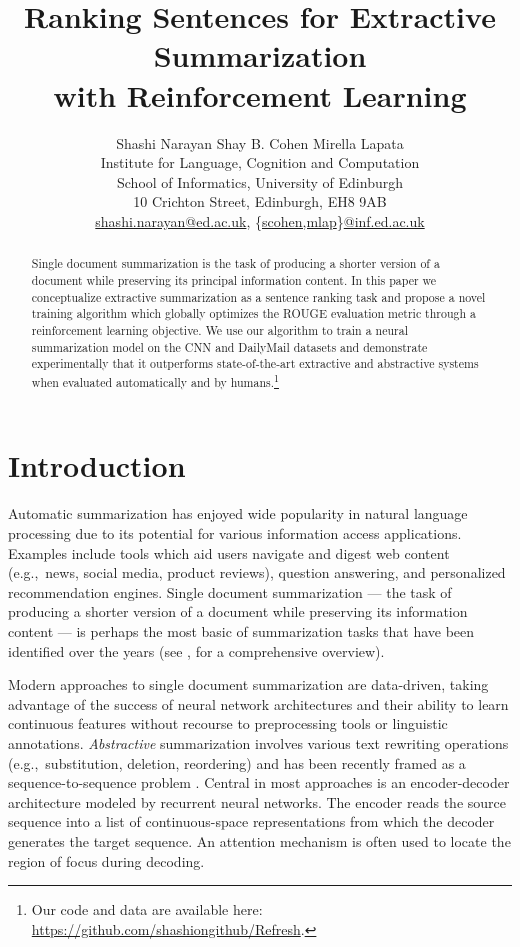 \documentclass[11pt,a4paper]{article}
\title{Ranking Sentences for Extractive Summarization \\ with
  Reinforcement Learning}
\author{Shashi Narayan \quad Shay B. Cohen \quad Mirella Lapata \\ 
Institute for Language, Cognition and Computation \\
 School of Informatics, University of Edinburgh \\ 
 10 Crichton Street, Edinburgh, EH8 9AB  \\ 
\url{shashi.narayan@ed.ac.uk},
\{\url{scohen,mlap}\}\url{@inf.ed.ac.uk} 
}
\date{}
\begin{document}
\maketitle

\begin{abstract}
  Single document summarization is the task of producing a shorter
  version of a document while preserving its principal information
  content.  In this paper we conceptualize extractive summarization as
  a sentence ranking task and propose a novel training algorithm which
  globally optimizes the ROUGE evaluation metric through a
  reinforcement learning objective.  We use our algorithm to train a
  neural summarization model on the CNN and DailyMail datasets and
  demonstrate experimentally that it outperforms state-of-the-art
  extractive and abstractive systems when evaluated automatically and
  by humans.\footnote{Our code and data are available here:
    \url{https://github.com/shashiongithub/Refresh}.}
\end{abstract}

\section{Introduction}
\label{sec:intro}

Automatic summarization has enjoyed wide popularity in natural
language processing due to its potential for various information
access applications. Examples include tools which aid users navigate
and digest web content (e.g.,~news, social media, product reviews),
question answering, and personalized recommendation engines. Single
document summarization --- the task of producing a shorter version of
a document while preserving its information content --- is perhaps the
most basic of summarization tasks that have been identified over the
years (see \citeauthor{Nenkova:McKeown:2011},
\citeyear{Nenkova:McKeown:2011} for a comprehensive overview).

Modern approaches to single document summarization are data-driven,
taking advantage of the success of neural network architectures and
their ability to learn continuous features without recourse to
preprocessing tools or linguistic annotations.  \emph{Abstractive}
summarization involves various text rewriting operations
(e.g.,~substitution, deletion, reordering) and has been recently
framed as a sequence-to-sequence problem
\cite{sutskever-nips14}. Central in most approaches
\cite{rush-acl15,chenIjcai-16,nallapati-signll16,see-acl17,tanwan-acl17,paulus-socher-arxiv17}
is an encoder-decoder architecture modeled by recurrent neural
networks. The encoder reads the source sequence into a list of
continuous-space representations from which the decoder generates the
target sequence. An attention mechanism \cite{bahdanau-arxiv14} is
often used to locate the region of focus during decoding.
\end{document}

